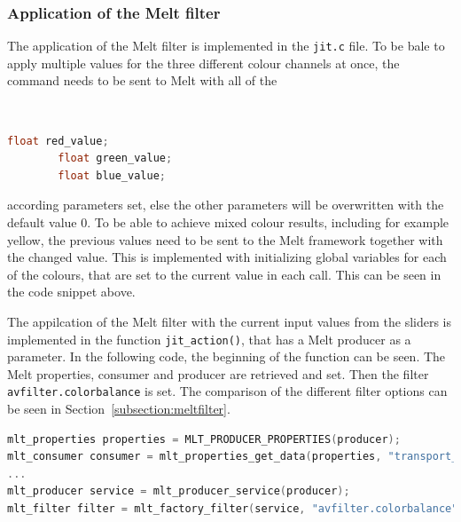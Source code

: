 \documentclass[../MasterThesis.tex]{subfiles}
\begin{document}
\subsubsection*{Application of the Melt filter}


\begin{minipage}{0.60\textwidth}
	The application of the Melt filter is implemented in the \texttt{jit.c} file. To be bale to apply multiple values for the three different colour channels at once, the command needs to be sent to Melt with all of the 
\end{minipage}\begin{minipage}{0.04\textwidth}
	\ 
\end{minipage}\begin{minipage}{0.36\textwidth}
	{\tiny\begin{lstlisting}[language=c, numbers=none]
		float red_value;
		float green_value;
		float blue_value; \end{lstlisting}}
	\vfill
\end{minipage}

according parameters set, else the other parameters will be overwritten with the default value $0$. To be able to achieve mixed colour results, including for example yellow, the previous values need to be sent to the Melt framework together with the changed value. This is implemented with initializing global variables for each of the colours, that are set to the current value in each call. This can be seen in the code snippet above.

The appilcation of the Melt filter with the current input values from the sliders is implemented in the function \texttt{jit\_action()}, that has a Melt producer as a parameter. In the following code, the beginning of the function can be seen. The Melt properties, consumer and producer are retrieved and set. Then the filter \texttt{avfilter.colorbalance} is set. The comparison of the different filter options can be seen in Section~\ref{subsection:meltfilter}.


\begin{lstlisting}[language=c, numbers=none, columns=fullflexible]	
mlt_properties properties = MLT_PRODUCER_PROPERTIES(producer);
mlt_consumer consumer = mlt_properties_get_data(properties, "transport_consumer", NULL);
...	
mlt_producer service = mlt_producer_service(producer);
mlt_filter filter = mlt_factory_filter(service, "avfilter.colorbalance", NULL);	
\end{lstlisting}
\end{document}
